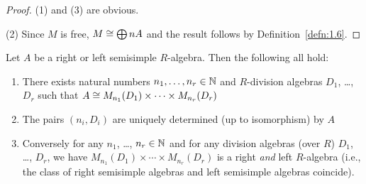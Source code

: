 \begin{proof}
(1) and (3) are obvious.

(2) Since $M$ is free, $M\cong\bigoplus nA$ and the result follows by Definition~\ref{defn:1.6}.
\end{proof}

\begin{theorem}\label{thm:3.19}
Let $A$ be a right or left semisimple $R$-algebra. Then the following
all hold:
\begin{enumerate}
\item There exists natural numbers $n_{1},\dots,n_{r}\in\mathbb{N}$ and
  $R$-division algebras
  $D_{1}$, \dots, $D_{r}$ such that $A\cong M_{n_{1}}(D_{1})\times\cdots\times M_{n_{r}}(D_{r})$
\item The pairs $(n_{i},D_{i})$ are uniquely determined (up to
  isomorphism) by $A$
\item Conversely for any $n_{1}$, \dots, $n_{r}\in\mathbb{N}$ and for any
  division algebras (over $R$) $D_{1}$, \dots, $D_{r}$, we have
  $M_{n_{1}}(D_{1})\times\cdots\times M_{n_{r}}(D_{r})$ is a right
  \emph{and} left $R$-algebra (i.e., the class of right
  semisimple algebras and left semisimple algebras coincide).
\end{enumerate}
\end{theorem}

